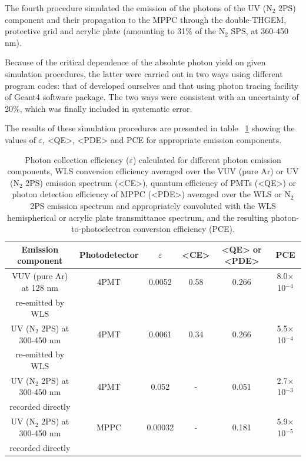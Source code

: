 \documentclass[a4paper,11pt]{article}
\begin{document}
The fourth procedure simulated the emission of the photons of the UV (N$_2$ 2PS) component and their propagation to the MPPC through the double-THGEM, protective grid and acrylic plate (amounting to 31\% of the N$_2$ SPS, at 360-450 nm).

Because of the critical dependence of the absolute photon yield on given simulation procedures, the latter were carried out in two ways using different program codes: that of developed ourselves and that using photon tracing facility of Geant4 software package. The two ways were consistent with an uncertainty of 20\%, which was finally included in systematic error.

The results of these simulation procedures are presented in table ~\ref{tab.1} showing the values of $\varepsilon$, <QE>, <PDE> and PCE for appropriate emission components.

\begin{table}
	\caption{\label{tab.1} Photon collection efficiency ($\varepsilon$) calculated for different photon emission components, WLS conversion efficiency averaged over the VUV (pure Ar) or UV (N$_2$ 2PS) emission spectrum (<CE>), quantum efficiency of PMTs (<QE>) or photon detection efficiency of MPPC (<PDE>) averaged over the WLS or N$_2$ 2PS emission spectrum and appropriately convoluted with the WLS hemispherical or acrylic plate transmittance spectrum, and the resulting photon-to-photoelectron conversion efficiency (PCE). }
	\begin{center}
		\begin{tabular}{|cccccc|}
			\hline
			Emission component & Photodetector & $\varepsilon$ & <CE> & <QE> or <PDE> & PCE \\
			\hline
			VUV (pure Ar) at 128 nm & 4PMT & 0.0052 & 0.58 & 0.266  & 8.0$\times$10$^{-4}$ \\
			re-emitted by WLS & & & & & \\
			UV (N$_2$ 2PS) at 300-450 nm & 4PMT & 0.0061 & 0.34 & 0.266 & 5.5$\times$10$^{-4}$ \\
			re-emitted by WLS & & & & & \\
			UV (N$_2$ 2PS) at 300-450 nm & 4PMT & 0.052 & - & 0.051  & 2.7$\times$10$^{-3}$ \\
			recorded directly & & & & & \\
			UV (N$_2$ 2PS) at 300-450 nm & MPPC & 0.00032 & - & 0.181  & 5.9$\times$10$^{-5}$ \\
			recorded directly & & & & & \\				
			\hline
		\end{tabular}
	\end{center}
\end{table}
\end{document}
